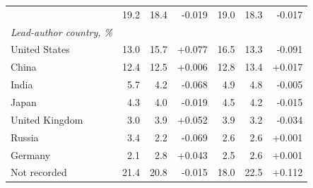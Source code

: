 \begin{table}[H]
\begin{tabular}{@{}lrrrrrr@{}}
\quad 2020 & 19.2 & 18.4 & -0.019 & 19.0 & 18.3 & -0.017 \\
\addlinespace[3pt]\emph{Lead-author country, \%} & & & & & & \\
\quad United States & 13.0 & 15.7 & +0.077 & 16.5 & 13.3 & -0.091 \\
\quad China & 12.4 & 12.5 & +0.006 & 12.8 & 13.4 & +0.017 \\
\quad India & 5.7 & 4.2 & -0.068 & 4.9 & 4.8 & -0.005 \\
\quad Japan & 4.3 & 4.0 & -0.019 & 4.5 & 4.2 & -0.015 \\
\quad United Kingdom & 3.0 & 3.9 & +0.052 & 3.9 & 3.2 & -0.034 \\
\quad Russia & 3.4 & 2.2 & -0.069 & 2.6 & 2.6 & +0.001 \\
\quad Germany & 2.1 & 2.8 & +0.043 & 2.5 & 2.6 & +0.001 \\
\quad Not recorded & 21.4 & 20.8 & -0.015 & 18.0 & 22.5 & +0.112 \\
\bottomrule
\end{tabular}
\end{table}
